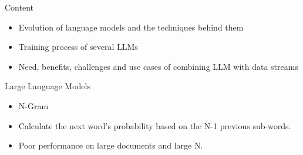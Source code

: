\documentclass[t]{beamer}
\begin{document}
\begin{frame}{Content}
  \vspace{1cm}
  \begin{itemize}
    \item Evolution of language models and the techniques behind them
    \newline
    \item Training process of several LLMs
    \newline
    \item Need, benefits, challenges and use cases of combining LLM with data streams
  \end{itemize}
\end{frame}
\begin{frame}{Large Language Models}
  \vspace{3cm}
  \centering
\vspace{1cm}
\begin{itemize}
  \item N-Gram \cite{Cavnar94}
  \item Calculate the next word's probability based on the N-1 previous sub-words.
  \item Poor performance on large documents and large N.
\end{itemize}
\end{frame}
\end{document}
